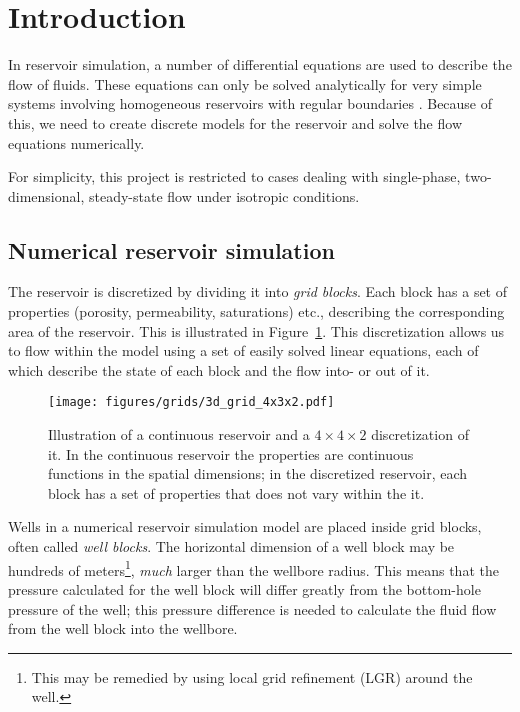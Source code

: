 
\section{Introduction} %
\label{sec:introduction}
In reservoir simulation, a number of differential equations are used to describe the flow of fluids. These equations can only be solved analytically for very simple systems involving homogeneous reservoirs with regular boundaries \cite{Peaceman1977Fundamentals}. Because of this, we need to create discrete models for the reservoir and solve the flow equations numerically.

For simplicity, this project is restricted to cases dealing with single-phase, two-dimensional, steady-state flow under isotropic conditions.

\subsection{Numerical reservoir simulation} %
\label{sub:numerical_reservoir_simulation}


The reservoir is discretized by dividing it into \emph{grid blocks}. Each block has a set of properties (porosity, permeability, saturations) etc., describing the corresponding area of the reservoir. This is illustrated in Figure~\ref{fig:grid-discretization}. This discretization allows us to flow within the model using a set of easily solved linear equations, each of which describe the state of each block and the flow into- or out of it.

\begin{figure}[htbp]
    \centering
    \texttt{[image: figures/grids/3d\_grid\_4x3x2.pdf]}
    \caption{Illustration of a continuous reservoir and a $4\times 4\times 2$ discretization of it. In the continuous reservoir the properties are continuous functions in the spatial dimensions; in the discretized reservoir, each block has a set of properties that does not vary within the it.}
    \label{fig:grid-discretization}
\end{figure}


Wells in a numerical reservoir simulation model are placed inside grid blocks, often called \emph{well blocks}. The horizontal dimension of a well block may be hundreds of meters\footnote{This may be remedied by using local grid refinement (LGR) around the well.}, \emph{much} larger than the wellbore radius. This means that the pressure calculated for the well block will differ greatly from the bottom-hole pressure of the well; this pressure difference is needed to calculate the fluid flow  from the well block into the wellbore.

